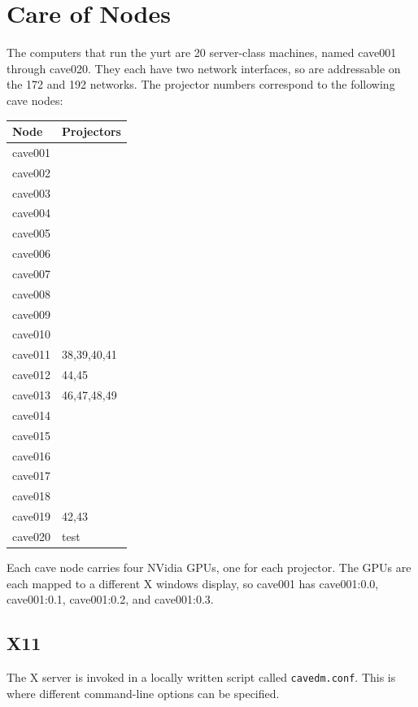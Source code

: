 \documentclass[11pt]{article}
\begin{document}
\section{Care of Nodes}

The computers that run the yurt are 20 server-class machines, named
cave001 through cave020.  They each have two network interfaces, so
are addressable on the 172 and 192 networks.  The projector numbers
correspond to the following cave nodes:

\begin{center}
\begin{tabular}{ll}
\textbf{Node} & \textbf{Projectors} \\ \hline
cave001  &  \\
cave002  &  \\
cave003  &  \\
cave004  &  \\
cave005  &  \\
cave006  &  \\
cave007  &  \\
cave008  &  \\
cave009  &  \\
cave010  &  \\
cave011  & 38,39,40,41 \\
cave012  & 44,45 \\
cave013  & 46,47,48,49 \\
cave014  &  \\
cave015  &  \\
cave016  &  \\
cave017  &  \\
cave018  &  \\
cave019  & 42,43 \\
cave020  & test \\
\end{tabular}
\end{center}

Each cave node carries four NVidia GPUs, one for each projector.  The
GPUs are each mapped to a different X windows display, so cave001 has
cave001:0.0, cave001:0.1, cave001:0.2, and cave001:0.3.

\subsection{X11}

The X server is invoked in a locally written script called
\texttt{cavedm.conf}.  This is where different command-line options
can be specified.
\end{document}
